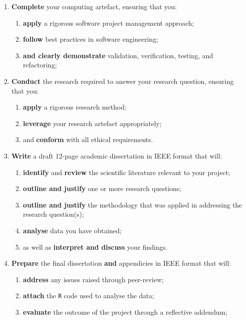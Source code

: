 \begin{enumerate}[label=(\Alph*)]
	\item \textbf{Complete} your computing artefact, ensuring that you:
		\begin{enumerate}[label=(\roman*)]
			\item \textbf{apply} a rigorous software project management approach;
			\item \textbf{follow} best practices in software engineering;
			\item \textbf{and clearly demonstrate} validation, verification, testing, and refactoring;
		\end{enumerate}
	\item \textbf{Conduct} the research required to answer your research question,
		ensuring that you:
		\begin{enumerate}[label=(\roman*)]
			\item \textbf{apply} a rigorous research method;
			\item \textbf{leverage} your research artefact appropriately;
			\item and \textbf{conform} with all ethical requirements.
		\end{enumerate}
	\item \textbf{Write} a draft 12-page academic dissertation in IEEE format
		that will:
		\begin{enumerate}[label=(\roman*)]
			\item \textbf{identify} and \textbf{review} the scientific literature relevant to your project;
			\item \textbf{outline and justify} one or more research questions;
			\item \textbf{outline and justify} the methodology that was applied in addressing the research question(s);
			\item \textbf{analyse} data you have obtained;
			\item as well as \textbf{interpret and discuss} your findings.
		\end{enumerate}
	\item \textbf{Prepare} the final dissertation \textbf{and} appendicies in IEEE format that will:
		\begin{enumerate}[label=(\roman*)]
			\item \textbf{address} any issues raised through peer-review;
			\item \textbf{attach} the \texttt{R} code used to analyse the data;
			\item \textbf{evaluate} the outcome of the project through a reflective addendum;

\end{enumerate}
\end{enumerate}
